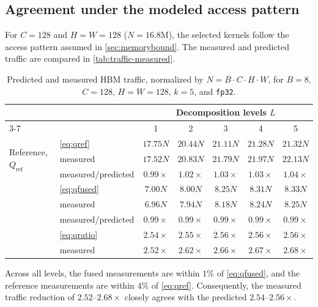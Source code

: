 \documentclass[10pt]{article} %
\newcommand{\Qio}{Q}                    %
\theoremstyle{plain}
\begin{document}
\subsection{Agreement under the modeled access pattern}
\label{app:traffic-good}

For $C{=}128$ and $H{=}W{=}128$ ($N=16.8$M), the selected kernels follow the
access pattern assumed in \autoref{sec:memorybound}. The measured and predicted
traffic are compared in \autoref{tab:traffic-measured}.

\begin{table}[h]
\centering
\caption{Predicted and measured HBM traffic, normalized by
$N=B\cdot C\cdot H\cdot W$, for $B{=}8$, $C{=}128$, $H{=}W{=}128$, $k{=}5$,
and \texttt{fp32}.}
\label{tab:traffic-measured}
\begin{tabular}{llccccc}
\toprule
& & \multicolumn{5}{c}{Decomposition levels $L$}\\
\cmidrule(lr){3-7}
& & 1 & 2 & 3 & 4 & 5 \\
\midrule
\multirow{3}{*}{Reference, $\Qio_{\mathrm{ref}}$}
  & \autoref{eq:qref}   & $17.75N$ & $20.44N$ & $21.11N$ & $21.28N$ & $21.32N$ \\
  & measured            & $17.52N$ & $20.83N$ & $21.79N$ & $21.97N$ & $22.13N$ \\
  & measured/predicted  & $0.99\times$ & $1.02\times$ & $1.03\times$ & $1.03\times$ & $1.04\times$ \\
\addlinespace[3pt]
\multirow{3}{*}{Fused, $\Qio_{\mathrm{fused}}$}
  & \autoref{eq:qfused} & $7.00N$  & $8.00N$  & $8.25N$  & $8.31N$  & $8.33N$ \\
  & measured            & $6.96N$  & $7.94N$  & $8.18N$  & $8.24N$  & $8.25N$ \\
  & measured/predicted  & $0.99\times$ & $0.99\times$ & $0.99\times$ & $0.99\times$ & $0.99\times$ \\
\addlinespace[3pt]
\multirow{2}{*}{Traffic reduction}
  & \autoref{eq:qratio} & $2.54\times$ & $2.55\times$ & $2.56\times$ & $2.56\times$ & $2.56\times$ \\
  & measured            & $2.52\times$ & $2.62\times$ & $2.66\times$ & $2.67\times$ & $2.68\times$ \\
\bottomrule
\end{tabular}
\end{table}

Across all levels, the fused measurements are within $1\%$ of
\autoref{eq:qfused}, and the reference measurements are within $4\%$ of
\autoref{eq:qref}. Consequently, the measured traffic reduction of
$2.52$--$2.68\times$ closely agrees with the predicted $2.54$--$2.56\times$.
\end{document}
